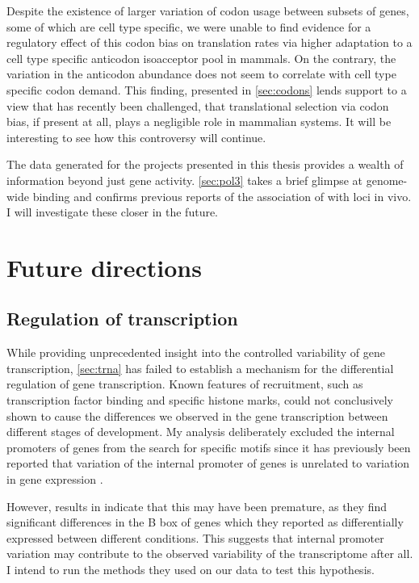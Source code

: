 Despite the existence of larger variation of codon usage between subsets of
genes, some of which are cell type specific, we were unable to find evidence for
a regulatory effect of this codon bias on translation rates via higher
adaptation to a cell type specific \trna anticodon isoacceptor pool in mammals.
On the contrary, the variation in the \trna anticodon abundance does not seem to
correlate with cell type specific codon demand. This finding, presented in
\cref{sec:codons} lends support to a view that has recently been challenged,
that translational selection via codon bias, if present at all, plays a
negligible role in mammalian systems. It will be interesting to see how this
controversy will continue.

The  \chipseq data generated for the projects presented in this thesis
provides a wealth of information beyond just \trna gene activity. \cref{sec:pol3}
takes a brief glimpse at genome-wide  binding and confirms previous reports
of the association of  with \transsine loci in vivo. I will investigate
these closer in the future.

\section{Future directions}

\subsection{Regulation of  transcription}

While providing unprecedented insight into the controlled variability of \trna gene
transcription, \cref{sec:trna} has failed to establish a mechanism for the
differential regulation of \trna gene transcription. Known features of 
recruitment, such as transcription factor binding and specific histone marks,
could not conclusively shown to cause the differences we observed in the \trna
gene transcription between different stages of development. My analysis
deliberately excluded the internal promoters of \trna genes from the search for
specific motifs since it has previously been reported that variation of the
internal promoter of \trna genes is unrelated to variation in gene expression
\citep{Oler:2010,Canella:2012}.

However, results in \citet{Gingold:2014} indicate that this may have been
premature, as they find significant differences in the B box of \trna genes
which they reported as differentially expressed between different conditions.
This suggests that internal promoter variation may contribute to the observed
variability of the \trna transcriptome after all. I intend to run the methods
they used on our data to test this hypothesis.

